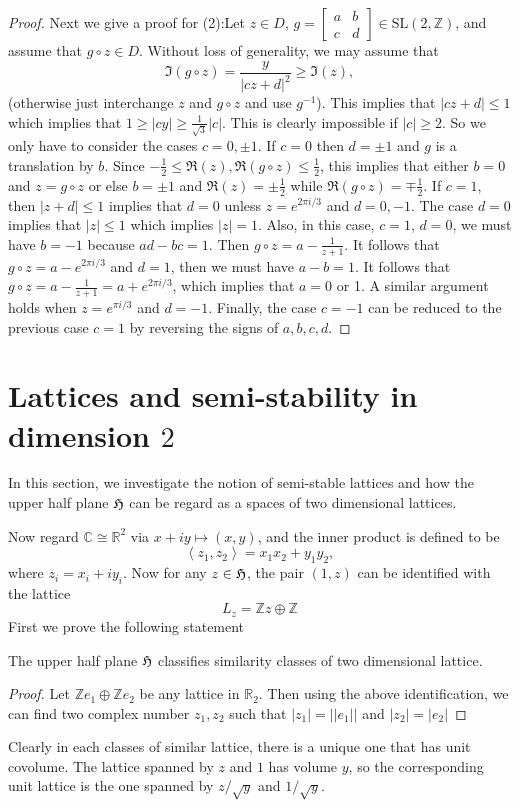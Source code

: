 \begin{proof}
  Next we give a proof for (2):Let $z \in D$, $g = \begin{bmatrix} a & b \\ c & d \end{bmatrix} \in \mathrm{SL}(2, \mathbb{Z})$, and assume that $g \circ z \in D$. Without loss of generality, we may assume that
  \[
    \Im(g \circ z) = \frac{y}{|cz + d|^2} \geq \Im(z),
  \]
  (otherwise just interchange $z$ and $g \circ z$ and use $g^{-1}$). This implies that $|cz + d| \leq 1$ which implies that $1 \geq |cy| \geq \frac{1}{\sqrt{3}}|c|$. This is clearly impossible if $|c| \geq 2$. So we only have to consider the cases $c = 0, \pm 1$. If $c = 0$ then $d = \pm 1$ and $g$ is a translation by $b$. Since $-\frac{1}{2} \leq \Re(z), \Re(g \circ z) \leq \frac{1}{2}$, this implies that either $b = 0$ and $z = g \circ z$ or else $b = \pm 1$ and $\Re(z) = \pm \frac{1}{2}$ while $\Re(g \circ z) = \mp \frac{1}{2}$. If $c = 1$, then $|z + d| \leq 1$ implies that $d = 0$ unless $z = e^{2\pi i / 3}$ and $d = 0, -1$. The case $d = 0$ implies that $|z| \leq 1$ which implies $|z| = 1$. Also, in this case, $c = 1$, $d = 0$, we must have $b = -1$ because $ad - bc = 1$. Then $g \circ z = a - \frac{1}{z + 1}$. It follows that $g \circ z = a - e^{2\pi i / 3}$ and $d = 1$, then we must have $a - b = 1$. It follows that $g \circ z = a - \frac{1}{z + 1} = a + e^{2\pi i / 3}$, which implies that $a = 0$ or 1. A similar argument holds when $z = e^{\pi i / 3}$ and $d = -1$. Finally, the case $c = -1$ can be reduced to the previous case $c = 1$ by reversing the signs of $a, b, c, d$.
\end{proof}
\section{Lattices and semi-stability in dimension $2$}
In this section, we investigate the notion of semi-stable lattices and how the
upper half plane $\operatorname{\mathfrak{H}}$ can be regard as a spaces of two dimensional lattices.

Now regard $\mathbb{C} \cong \mathbb{R}^2$ via $x+iy \mapsto (x,y)$, and the inner product is defined to be
\[\left\langle z_1, z_2 \right\rangle = x_1x_2 + y_1y_2,\]
where $z_i= x_i+iy_i$. Now for any $z \in \operatorname{\mathfrak{H}}$, the pair $(1,z)$ can be identified with the lattice
\[L_z = \mathbb{Z}z \oplus \mathbb{Z}\]
First we prove the following statement
\begin{prop}
  The upper half plane $\operatorname{\mathfrak{H}}$ classifies similarity classes of two dimensional lattice.
\end{prop}
\begin{proof}
  Let $\mathbb{Z}e_1\oplus \mathbb{Z}e_2$ be any lattice in $\mathbb{R}_2$. Then using the
  above identification, we can find two complex number $z_1,z_2$ such that $|z_1| = ||e_1||$ and
  $|z_2| = \lvert e_2 \rvert$
\end{proof}
Clearly in each classes of similar lattice, there is a unique one that has unit covolume.
The lattice spanned by $z$ and $1$ has volume $y$, so the corresponding unit lattice is the one spanned
by $z/\sqrt{y}$ and $1/\sqrt{y}$.

